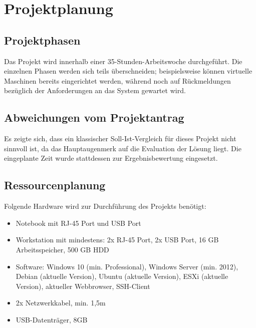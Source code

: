 \section{Projektplanung} 
\label{sec:Projektplanung}

\subsection{Projektphasen}
\label{sec:Projektphasen}
Das Projekt wird innerhalb einer 35-Stunden-Arbeitswoche durchgeführt. Die einzelnen Phasen werden sich teils überschneiden; beispielsweise können virtuelle Maschinen bereits eingerichtet werden, während noch auf Rückmeldungen bezüglich der Anforderungen an das System gewartet wird. 

\subsection{Abweichungen vom Projektantrag}
\label{sec:AbweichungenProjektantrag}
Es zeigte sich, dass ein klassischer Soll-Ist-Vergleich für dieses Projekt nicht sinnvoll ist, da das Hauptaugenmerk auf die Evaluation der Lösung liegt. Die eingeplante Zeit wurde stattdessen zur Ergebnisbewertung eingesetzt.

\subsection{Ressourcenplanung}
\label{sec:Ressourcenplanung}
Folgende Hardware wird zur Durchführung des Projekts benötigt:
\begin{itemize}
  \item Notebook mit RJ-45 Port und USB Port
  \item Workstation mit mindestens: 2x RJ-45 Port, 2x USB Port, 16 GB Arbeitsspeicher, 500 GB HDD
  \item Software: Windows 10 (min. Professional), Windows Server (min. 2012), Debian (aktuelle Version), Ubuntu (aktuelle Version), ESXi (aktuelle Version), aktueller Webbrowser, SSH-Client
  \item 2x Netzwerkkabel, min. 1,5m
  \item USB-Datenträger, 8GB
\end{itemize}